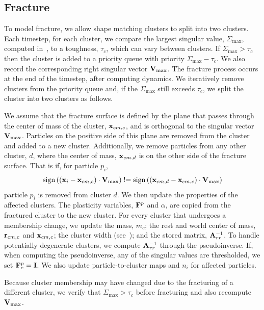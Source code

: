 \documentclass[review]{acmsiggraph}
\begin{document}
\subsection{Fracture}
\label{sec:Fracture}
To model fracture, we allow shape matching clusters to split into two clusters.  Each timestep, for each cluster,
we compare the largest singular value, $\Sigma_{\max}$, computed in~, to a toughness, $\tau_c$, which
can vary between clusters.  
If $\Sigma_{\max} > \tau_c$ then the cluster is added to a priority queue with priority $\Sigma_{\max} - \tau_c$.  We also
record the corresponding right singular vector $\mathit{\mathbf{V}}_{\max}$.  The fracture process occurs 
at the end of the timestep, after computing dynamics.  We iteratively remove
clusters from the priority queue and, if the $\Sigma_{\max}$ still exceeds $\tau_c$, we split the cluster into two clusters
as follows.

We assume that the fracture surface is defined by the plane that passes through the center of mass of the 
cluster, $\mathit{\mathbf{x}}_{cm,c}$, and is orthogonal to the singular vector $\mathit{\mathbf{V}}_{\max}$.  Particles on the positive%
 side of this plane are removed from the cluster and added to a new cluster.  Additionally, we remove particles 
from any other cluster, $d$, where the center of mass, $\mathit{\mathbf{x}}_{cm,d}$ is on the other side of the fracture surface.
That is if, for particle $p_i$,
\begin{equation}
\mathrm{sign}\left(\left(\mathit{\mathbf{x}}_i-\mathit{\mathbf{x}}_{cm,c}\right)\cdot \mathit{\mathbf{V}}_{\max}\right) \mathrel{!}=
\mathrm{sign}\left(\left(\mathit{\mathbf{x}}_{cm,d}-\mathit{\mathbf{x}}_{cm,c}\right)\cdot \mathit{\mathbf{V}}_{\max}\right)
\end{equation}
particle $p_i$ is removed from cluster $d$.  We then update the properties of the affected clusters.
The plasticity variables, $\mathit{\mathbf{F}}^p$ and $\alpha$, are copied from the fractured cluster to the new cluster.
For every cluster that undergoes a membership change, we update the mass, $m_c$; the 
rest and world center of mass, $\mathit{\mathbf{r}}_{cm,c}$ and $\mathit{\mathbf{x}}_{cm,c}$; the cluster width (see~\cite{Bargteil:2014:SLF});
and the stored matrix, $\mathit{\mathbf{A}}_{rr}^{-1}$.  To handle potentially degenerate clusters, we compute $\mathit{\mathbf{A}}_{rr}^{-1}$
through the pseudoinverse.  If, when computing the pseudoinverse, any of the singular values are thresholded,
we set $\mathit{\mathbf{F}}_c^p = \mathit{\mathbf{I}}$.  We also update particle-to-cluster maps and $n_i$ for affected particles.

Because cluster membership may have changed due to the fracturing of a different cluster, we verify that 
$\Sigma_{\max} > \tau_c$ before fracturing and also recompute $\mathit{\mathbf{V}}_{\max}$.  
\end{document}
